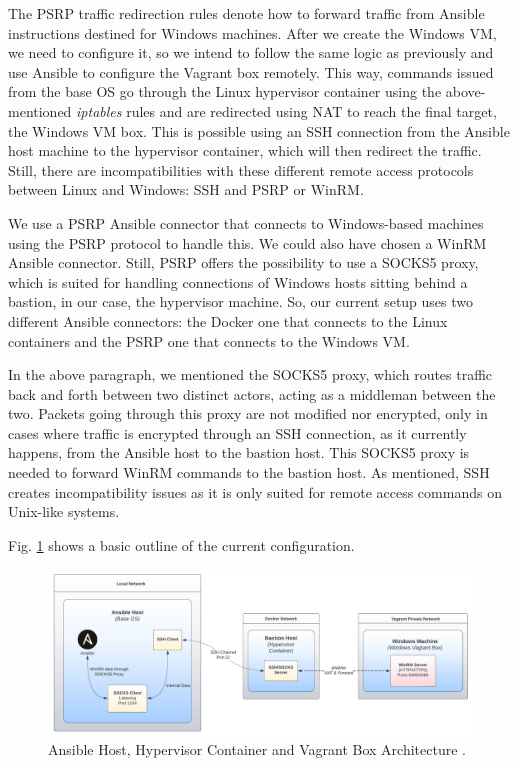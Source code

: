 
The PSRP traffic redirection rules denote how to forward traffic from Ansible instructions destined for Windows machines. After we create the Windows VM, we need to configure it, so we intend to follow the same logic as previously and use Ansible to configure the Vagrant box remotely. This way, commands issued from the base OS go through the Linux hypervisor container using the above-mentioned \textit{iptables} rules and are redirected using NAT to reach the final target, the Windows VM box. This is possible using an SSH connection from the Ansible host machine to the hypervisor container, which will then redirect the traffic. Still, there are incompatibilities with these different remote access protocols between Linux and Windows: SSH and PSRP or WinRM. 

We use a PSRP Ansible connector that connects to Windows-based machines using the PSRP protocol to handle this. We could also have chosen a WinRM Ansible connector. Still, PSRP offers the possibility to use a SOCKS5 proxy, which is suited for handling connections of Windows hosts sitting behind a bastion, in our case, the hypervisor machine. So, our current setup uses two different Ansible connectors: the Docker one that connects to the Linux containers and the PSRP one that connects to the Windows VM.

In the above paragraph, we mentioned the SOCKS5 proxy, which routes traffic back and forth between two distinct actors, acting as a middleman between the two. Packets going through this proxy are not modified nor encrypted, only in cases where traffic is encrypted through an SSH connection, as it currently happens, from the Ansible host to the bastion host. This SOCKS5 proxy is needed to forward WinRM commands to the bastion host. As mentioned, SSH creates incompatibility issues as it is only suited for remote access commands on Unix-like systems.

Fig. \ref{fig:vagrant_kvm_host} shows a basic outline of the current configuration.

\begin{figure}[H]
    \includegraphics[width=13cm]{figures/vagrant_kvm_setup.pdf}
    \caption{Ansible Host, Hypervisor Container and Vagrant Box Architecture \cite{vagrant_kvm_host_ref}.}
    \label{fig:vagrant_kvm_host}
\end{figure}

